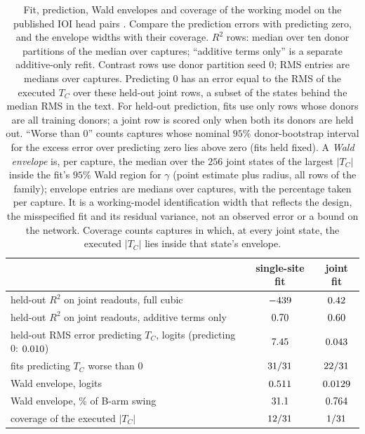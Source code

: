 \begin{table}[t]
\centering\small
\caption{Fit, prediction, Wald envelopes and coverage of the working model on the published IOI head pairs
. Compare the prediction errors with predicting zero, and the envelope widths with their coverage. $R^2$ rows: median over ten donor partitions of the median over captures; ``additive terms only'' is a
separate additive-only refit. Contrast rows use donor partition seed $0$; RMS entries are medians over captures. Predicting $0$ has an error
equal to the RMS of the executed $T_C$ over these held-out joint rows, a subset of the states behind the median RMS
in the text.
For held-out prediction, fits use only rows whose donors are all training donors; a joint row is scored only when both its donors are held out.
``Worse than $0$'' counts captures whose nominal $95\%$ donor-bootstrap interval for the excess error over predicting
zero lies above zero (fits held fixed). A \emph{Wald envelope} is, per capture, the median over the $256$ joint states
of the largest $|T_C|$ inside the fit's $95\%$ Wald region for $\gamma$ (point estimate plus radius, all rows of the
family); envelope entries are medians over captures, with the percentage taken per capture. It is a working-model
identification width that reflects the design, the misspecified fit and its residual variance, not an observed error
or a bound on the network. Coverage counts captures in which, at every joint state, the executed $|T_C|$ lies inside
that state's envelope.}
\label{tab:scales}
\begin{tabular}{lcc}
\toprule
 & single-site fit & joint fit \\
\midrule
held-out $R^2$ on joint readouts, full cubic & $-439$ & $0.42$ \\
held-out $R^2$ on joint readouts, additive terms only & $0.70$ & $0.60$ \\
held-out RMS error predicting $T_C$, logits (predicting $0$: $0.010$) & $7.45$ & $0.043$ \\
fits predicting $T_C$ worse than $0$ & $31/31$ & $22/31$ \\
Wald envelope, logits & $0.511$ & $0.0129$ \\
Wald envelope, \% of B-arm swing & $31.1$ & $0.764$ \\
coverage of the executed $|T_C|$ & $12/31$ & $1/31$ \\
\bottomrule
\end{tabular}
\end{table}

